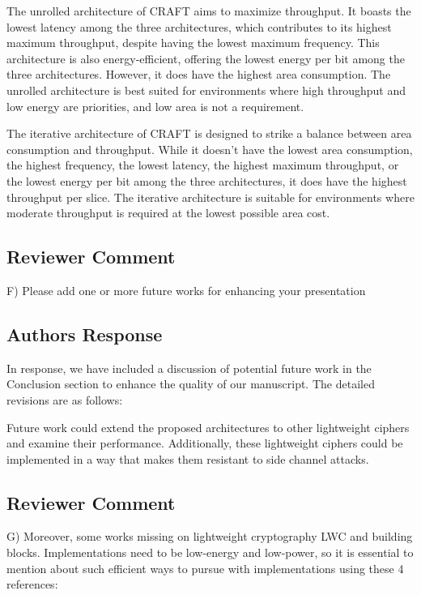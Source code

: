 The unrolled architecture of CRAFT aims to maximize throughput. It boasts the lowest latency among the three architectures, which contributes to its highest maximum throughput, despite having the lowest maximum frequency. This architecture is also energy-efficient, offering the lowest energy per bit among the three architectures. However, it does have the highest area consumption. The unrolled architecture is best suited for environments where high throughput and low energy are priorities, and low area is not a requirement.

The iterative architecture of CRAFT is designed to strike a balance between area consumption and throughput. While it doesn't have the lowest area consumption, the highest frequency, the lowest latency, the highest maximum throughput, or the lowest energy per bit among the three architectures, it does have the highest throughput per slice. The iterative architecture is suitable for environments where moderate throughput is required at the lowest possible area cost.

\color{black}



\subsection{Reviewer Comment}
F) Please add one or more future works for enhancing your presentation

\subsection{Authors Response}

In response, we have included a discussion of potential future work in the Conclusion section to enhance the quality of our manuscript. The detailed revisions are as follows:

\color{blue}

Future work could extend the proposed architectures to other lightweight ciphers and examine their performance. Additionally, these lightweight ciphers could be implemented in a way that makes them resistant to side channel attacks.

\color{black}



\subsection{Reviewer Comment}
G) Moreover, some works missing on lightweight cryptography LWC and building blocks. Implementations need to be low-energy and low-power, so it is essential to mention about such efficient ways to pursue with implementations using these 4 references:

